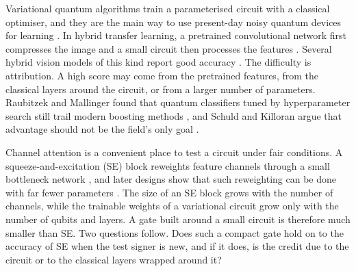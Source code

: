 \documentclass[10pt,twocolumn]{article}
\begin{document}
Variational quantum algorithms train a parameterised circuit with a
classical optimiser, and they are the main way to use present-day noisy
quantum devices for learning \citep{cerezo_2021_vqa,bharti_2022_nisq}. In
hybrid transfer learning, a pretrained convolutional network first
compresses the image and a small circuit then processes the features
\citep{mari_2020_transfer}. Several hybrid vision models of this kind report
good accuracy \citep{liu_2021_hqcnn,long_2025_hqcqcnn}. The difficulty is
attribution. A high score may come from the pretrained features, from the
classical layers around the circuit, or from a larger number of parameters.
Raubitzek and Mallinger found that quantum classifiers tuned by
hyperparameter search still trail modern boosting methods
\citep{raubitzek_2023_applicability}, and Schuld and Killoran argue that
advantage should not be the field's only goal \citep{schuld_2022_advantage}.

Channel attention is a convenient place to test a circuit under fair
conditions. A squeeze-and-excitation (SE) block reweights feature channels
through a small bottleneck network \citep{hu_2020_se}, and later designs
show that such reweighting can be done with far fewer parameters
\citep{wang_2020_eca,guo_2022_attention}. The size of an SE block grows with
the number of channels, while the trainable weights of a variational circuit
grow only with the number of qubits and layers. A gate built around a small
circuit is therefore much smaller than SE. Two questions follow. Does such a
compact gate hold on to the accuracy of SE when the test signer is new, and
if it does, is the credit due to the circuit or to the classical layers
wrapped around it?
\end{document}
